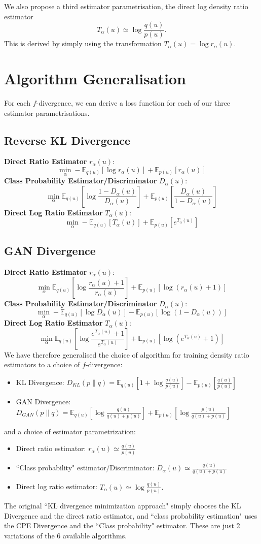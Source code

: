 \documentclass[honours,12pt]{unswthesis}
\newcommand{\E}{\mathbb{E}}
\numberwithin{equation}{section}
\theoremstyle{definition}
\begin{document}
We also propose a third estimator parametrisation, the direct log density ratio estimator
\[T_\alpha(u)\simeq \log \frac{q(u)}{p(u)}.\]
This is derived by simply using the transformation $T_\alpha(u)=\log r_\alpha(u)$.
\section{Algorithm Generalisation}
For each $f$-divergence, we can derive a loss function for each of our three estimator parametrisations.
\subsection{Reverse KL Divergence}
\textbf{Direct Ratio Estimator} $r_\alpha(u)$:
\[\min_\alpha -\mathbb{E}_{q(u)}[\log r_\alpha(u)]+\mathbb{E}_{p(u)}[r_\alpha(u)]\]
\textbf{Class Probability Estimator/Discriminator} $D_\alpha(u)$:
\[\min_\alpha \mathbb{E}_{q(u)}\left[\log \frac{1-D_\alpha(u)}{D_\alpha(u)}\right]+\mathbb{E}_{p(u)}\left[\frac{D_\alpha(u)}{1-D_\alpha(u)}\right]\]
\textbf{Direct Log Ratio Estimator} $T_\alpha(u)$:
\[\min_\alpha -\mathbb{E}_{q(u)}[T_\alpha(u)]+\mathbb{E}_{p(u)}[e^{T_\alpha (u)}]\]
\subsection{GAN Divergence}
\textbf{Direct Ratio Estimator} $r_\alpha(u)$:
\[\min_\alpha \E_{q(u)}\left[\log \frac{r_\alpha(u)+1}{r_\alpha(u)}\right]+\E_{p(u)}[\log (r_\alpha(u)+1)]\]
\textbf{Class Probability Estimator/Discriminator} $D_\alpha(u)$:
\[\min_\alpha -\E_{q(u)}[\log D_\alpha(u)]-\E_{p(u)}[\log (1-D_\alpha(u))]\]
\textbf{Direct Log Ratio Estimator} $T_\alpha(u)$:
\[\min_\alpha \E_{q(u)}\left[\log \frac{e^{T_\alpha(u)}+1}{e^{T_\alpha(u)}}\right]+\E_{p(u)}[\log(e^{T_\alpha(u)}+1)]\]
We have therefore generalised the choice of algorithm for training density ratio estimators to a choice of $f$-divergence:
\begin{itemize}
\item KL Divergence: $D_{KL}(p\|q)=\mathbb{E}_{q(u)}[1+\log \frac{q(u)}{p(u)}]-\mathbb{E}_{p(u)}\left[\frac{q(u)}{p(u)}\right]$
\item GAN Divergence: $D_{GAN}(p\|q)=\mathbb{E}_{q(u)}\left[\log \frac{q(u)}{q(u)+p(u)}\right]+\mathbb{E}_{p(u)}\left[\log \frac{p(u)}{q(u)+p(u)}\right]$
\end{itemize}
and a choice of estimator parametrization:
\begin{itemize}
\item Direct ratio estimator: $r_\alpha(u)\simeq\frac{q(u)}{p(u)}$
\item ``Class probability" estimator/Discriminator: $D_\alpha(u)\simeq\frac{q(u)}{q(u)+p(u)}$
\item Direct log ratio estimator: $T_\alpha(u)\simeq\log \frac{q(u)}{p(u)}.$
\end{itemize}
The original ``KL divergence minimization approach" simply chooses the KL Divergence and the direct ratio estimator, and ``class probability estimation" uses the CPE Divergence and the ``Class probability" estimator. These are just 2 variations of the 6 available algorithms.
\end{document}
